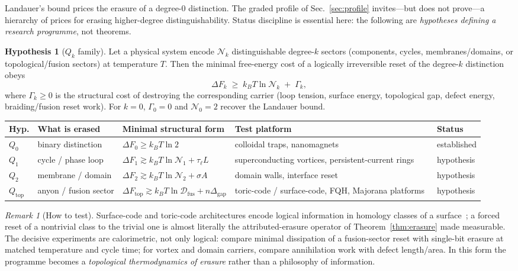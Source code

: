 \documentclass[11pt,a4paper]{article}
\theoremstyle{definition}
\newtheorem{hypothesis}{Hypothesis}
\theoremstyle{remark}
\newtheorem{remark}[theorem]{Remark}
\begin{document}
Landauer's bound prices the erasure of a degree-$0$ distinction.  The graded profile of
Sec.~\ref{sec:profile} invites---but does not prove---a hierarchy of prices for erasing
higher-degree distinguishability.  Status discipline is essential here: the following are
\emph{hypotheses defining a research programme}, not theorems.

\begin{hypothesis}[$Q_{k}$ family]
\label{hyp:qk}
Let a physical system encode $\mathcal N_{k}$ distinguishable degree-$k$ sectors (components,
cycles, membranes/domains, or topological/fusion sectors) at temperature $T$.  Then the minimal
free-energy cost of a logically irreversible reset of the degree-$k$ distinction obeys
\begin{equation}
\Delta F_{k}\;\ge\;k_{B}T\ln\mathcal N_{k}\;+\;\Gamma_{k},
\end{equation}
where $\Gamma_{k}\ge0$ is the structural cost of destroying the corresponding carrier (loop
tension, surface energy, topological gap, defect energy, braiding/fusion reset work).  For
$k=0$, $\Gamma_{0}=0$ and $\mathcal N_{0}=2$ recover the Landauer bound.
\end{hypothesis}

\begin{center}
\small
\begin{tabularx}{\textwidth}{@{}lYYYl@{}}
\toprule
\textbf{Hyp.} & \textbf{What is erased} & \textbf{Minimal structural form} &
\textbf{Test platform} & \textbf{Status}\\
\midrule
$Q_{0}$ & binary distinction & $\Delta F_{0}\ge k_{B}T\ln2$ &
colloidal traps, nanomagnets~\cite{Berut2012,Jun2014,Hong2016} & established\\
$Q_{1}$ & cycle / phase loop & $\Delta F_{1}\gtrsim k_{B}T\ln\mathcal N_{1}+\tau_{\ell}L$ &
superconducting vortices, persistent-current rings & hypothesis\\
$Q_{2}$ & membrane / domain & $\Delta F_{2}\gtrsim k_{B}T\ln\mathcal N_{2}+\sigma A$ &
domain walls, interface reset & hypothesis\\
$Q_{\mathrm{top}}$ & anyon / fusion sector &
$\Delta F_{\mathrm{top}}\gtrsim k_{B}T\ln\mathcal D_{\mathrm{fus}}+n\Delta_{\mathrm{gap}}$ &
toric-code / surface-code, FQH, Majorana platforms~\cite{Kitaev2003} & hypothesis\\
\bottomrule
\end{tabularx}
\end{center}

\begin{remark}[How to test]
Surface-code and toric-code architectures encode logical information in homology classes of a
surface~\cite{Kitaev2003}; a forced reset of a nontrivial class to the trivial one is almost
literally the attributed-erasure operator of Theorem~\ref{thm:erasure} made measurable.  The
decisive experiments are calorimetric, not only logical: compare minimal dissipation of a
fusion-sector reset with single-bit erasure at matched temperature and cycle time; for vortex
and domain carriers, compare annihilation work with defect length/area.  In this form the
programme becomes a \emph{topological thermodynamics of erasure} rather than a philosophy of
information.
\end{remark}
\end{document}
